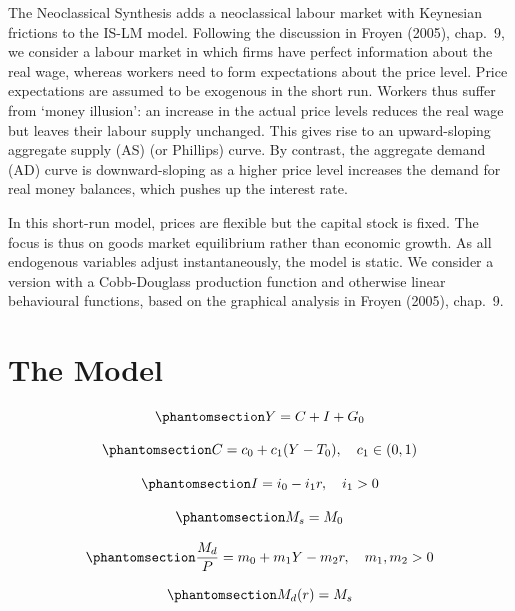 \documentclass[
  letterpaper,
  DIV=11,
  numbers=noendperiod]{scrreprt}
\begin{document}
The Neoclassical Synthesis adds a neoclassical labour market with
Keynesian frictions to the IS-LM model. Following the discussion in
Froyen (2005), chap.~9, we consider a labour market in which firms have
perfect information about the real wage, whereas workers need to form
expectations about the price level. Price expectations are assumed to be
exogenous in the short run. Workers thus suffer from `money illusion':
an increase in the actual price levels reduces the real wage but leaves
their labour supply unchanged. This gives rise to an upward-sloping
aggregate supply (AS) (or Phillips) curve. By contrast, the aggregate
demand (AD) curve is downward-sloping as a higher price level increases
the demand for real money balances, which pushes up the interest rate.

In this short-run model, prices are flexible but the capital stock is
fixed. The focus is thus on goods market equilibrium rather than
economic growth. As all endogenous variables adjust instantaneously, the
model is static. We consider a version with a Cobb-Douglass production
function and otherwise linear behavioural functions, based on the
graphical analysis in Froyen (2005), chap.~9.

\section{The Model}\label{the-model-2}

\begin{equation}\phantomsection\label{eq-Y-AS_AD}{
Y=C+I+G_0
}\end{equation}

\begin{equation}\phantomsection\label{eq-C-AS_AD}{
C=c_0+c_1(Y-T_0), \quad c_1 \in (0,1)
}\end{equation}

\begin{equation}\phantomsection\label{eq-I-AS_AD}{
I= i_0 - i_1r,  \quad i_1 > 0
}\end{equation}

\begin{equation}\phantomsection\label{eq-Ms-AS_AD}{
M_s=M_0
}\end{equation}

\begin{equation}\phantomsection\label{eq-Md-AS_AD}{
\frac{M_d}{P}=m_0 + m_1Y -m_2r, \quad m_1, m_2 > 0
}\end{equation}

\begin{equation}\phantomsection\label{eq-M_eq-AS_AD}{
M_d(r)=M_s 
}\end{equation}
\end{document}

